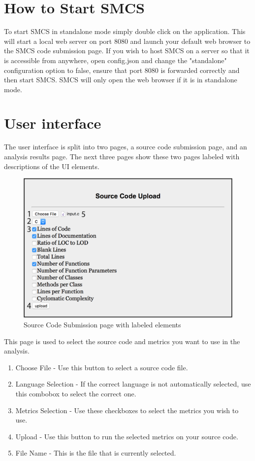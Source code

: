 \documentclass{scrreprt}
\begin{document}
	\section{How to Start SMCS}
	To start SMCS in standalone mode simply double click on the application. 
	This will start a local web server on port 8080 and launch your default web browser to the SMCS code submission page. 
	If you wish to host SMCS on a server so that it is accessible from anywhere, open config.json and change the "standalone" configuration option to false, ensure that port 8080 is forwarded correctly and then start SMCS. 
	SMCS will only open the web browser if it is in standalone mode.

	\section{User interface}
	The user interface is split into two pages, a source code submission page, and an analysis results page. The next three pages show these two pages labeled with descriptions of the UI elements.
	
	\begin{figure}[H]
		\centering
		\includegraphics[scale=0.7]{lguiu.png}
		\caption{Source Code Submission page with labeled elements}
	\end{figure}
	
	This page is used to select the source code and metrics you want to use in the analysis.
	
	\begin{enumerate}
		\item Choose File - Use this button to select a source code file.
		\item Language Selection - If the correct language is not automatically selected, use this combobox to select the correct one.
		\item Metrics Selection - Use these checkboxes to select the metrics you wish to use.
		\item Upload - Use this button to run the selected metrics on your source code.
		\item File Name - This is the file that is currently selected.
	\end{enumerate}
	
\end{document}
